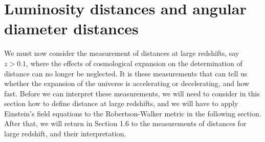 \documentclass[11pt]{ltjsarticle}
\theoremstyle{plain}
\theoremstyle{break}
\begin{document}
\section{Luminosity distances and angular diameter distances}
We must now consider the measurement of distances at large redshifts, say $z > 0.1$,
where the effects of cosmological expansion on the determination of distance can no longer be neglected.
It is these measurements that can tell us whether the expansion of the universe is accelerating or decelerating, and how fast.
Before we can interpret these measurements, we will need to consider in this section how to define distance at large redshifts, and we will have to apply Einstein's field equations to the Robertson-Walker metric in the following section.
After that, we will return in Section 1.6 to the measurements of distances for large redshift, and their interpretation.
\end{document}
